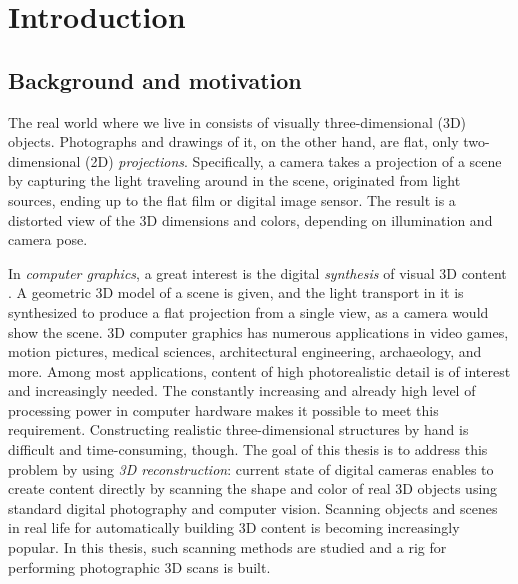 \section{Introduction}

\thispagestyle{empty}

\subsection{Background and motivation}


The real world where we live in consists of visually three-dimensional (3D) objects.
Photographs and drawings of it, on the other hand, are flat, only two-dimensional (2D) \emph{projections}.
Specifically, a camera takes a projection of a scene by capturing the light traveling around in the scene, originated from light sources, ending up to the flat film or digital image sensor.
The result is a distorted view of the 3D dimensions and colors, depending on illumination and camera pose.


In \emph{computer graphics}, a great interest is the digital \emph{synthesis} of visual 3D content \cite{foley1990computer}.
A geometric 3D model of a scene is given, and the light transport in it is synthesized to produce a flat projection from a single view, as a camera would show the scene.
3D computer graphics has numerous applications in video games, motion pictures, medical sciences, architectural engineering, archaeology, and more.
Among most applications, content of high photorealistic detail is of interest and increasingly needed.
The constantly increasing and already high level of processing power in computer hardware makes it possible to meet this requirement.
Constructing realistic three-dimensional structures by hand is difficult and time-consuming, though.
The goal of this thesis is to address this problem by using \emph{3D reconstruction}: current state of digital cameras enables to create content directly by scanning the shape and color of real 3D objects using standard digital photography and computer vision.
Scanning objects and scenes in real life for automatically building 3D content is becoming increasingly popular.
In this thesis, such scanning methods are studied and a rig for performing photographic 3D scans is built.


